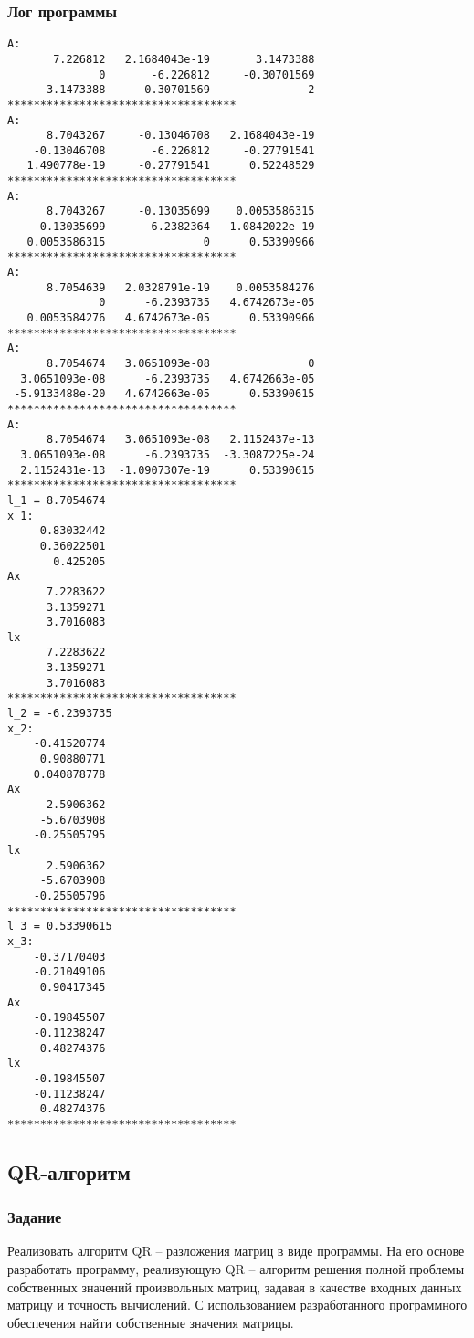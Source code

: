 \documentclass[a4paper,12pt]{article}
\begin{document}
\subsubsection{Лог программы}
\begin{verbatim}
A:
       7.226812   2.1684043e-19       3.1473388
              0       -6.226812     -0.30701569
      3.1473388     -0.30701569               2
***********************************
A:
      8.7043267     -0.13046708   2.1684043e-19
    -0.13046708       -6.226812     -0.27791541
   1.490778e-19     -0.27791541      0.52248529
***********************************
A:
      8.7043267     -0.13035699    0.0053586315
    -0.13035699      -6.2382364   1.0842022e-19
   0.0053586315               0      0.53390966
***********************************
A:
      8.7054639   2.0328791e-19    0.0053584276
              0      -6.2393735   4.6742673e-05
   0.0053584276   4.6742673e-05      0.53390966
***********************************
A:
      8.7054674   3.0651093e-08               0
  3.0651093e-08      -6.2393735   4.6742663e-05
 -5.9133488e-20   4.6742663e-05      0.53390615
***********************************
A:
      8.7054674   3.0651093e-08   2.1152437e-13
  3.0651093e-08      -6.2393735  -3.3087225e-24
  2.1152431e-13  -1.0907307e-19      0.53390615
***********************************
l_1 = 8.7054674
x_1:
     0.83032442
     0.36022501
       0.425205
Ax
      7.2283622
      3.1359271
      3.7016083
lx
      7.2283622
      3.1359271
      3.7016083
***********************************
l_2 = -6.2393735
x_2:
    -0.41520774
     0.90880771
    0.040878778
Ax
      2.5906362
     -5.6703908
    -0.25505795
lx
      2.5906362
     -5.6703908
    -0.25505796
***********************************
l_3 = 0.53390615
x_3:
    -0.37170403
    -0.21049106
     0.90417345
Ax
    -0.19845507
    -0.11238247
     0.48274376
lx
    -0.19845507
    -0.11238247
     0.48274376
***********************************
\end{verbatim}

\newpage

\subsection{QR-алгоритм}
\subsubsection{Задание}
Реализовать алгоритм QR – разложения матриц в виде программы.
На его основе разработать программу, реализующую QR – алгоритм решения
полной проблемы собственных значений произвольных матриц, задавая в
качестве входных данных матрицу и точность вычислений. С использованием
разработанного программного обеспечения найти собственные значения матрицы.
\end{document}
